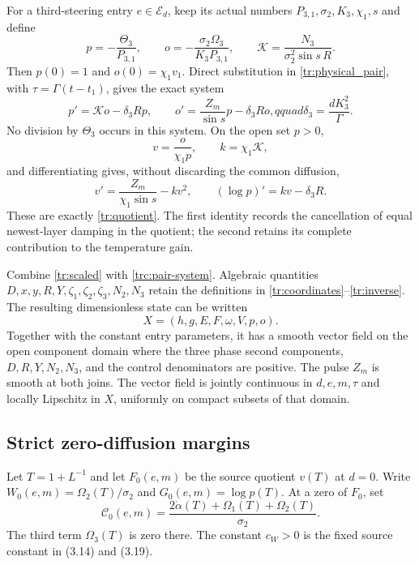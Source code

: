 For a third-steering entry $e\in\mathcal E_d$, keep its actual numbers
$P_{3,1},\sigma_2,K_3,\chi_1,s$ and define
\begin{equation}\label{trc:pair-coordinates}
 p=-\frac{\Theta_3}{P_{3,1}},\qquad
 o=-\frac{\sigma_2\Omega_3}{K_3P_{3,1}},\qquad
 \mathcal K=\frac{N_3}{\sigma_2^2\sin s\,R}.
\end{equation}
Then $p(0)=1$ and $o(0)=\chi_1v_1$.  Direct substitution in
\eqref{tr:physical_pair}, with $\tau=\Gamma(t-t_1)$, gives the exact system
\begin{equation}\label{trc:pair-system}
 p'=\mathcal K o-\delta_3Rp,\qquad
 o'=\frac{Z_m}{\sin s}p-\delta_3Ro,qquad
 \delta_3=\frac{dK_3^2}{\Gamma}.
\end{equation}
No division by $\Theta_3$ occurs in this system.  On the open set $p>0$,
\begin{equation}\label{trc:quotient-map}
 v=\frac{o}{\chi_1p},\qquad k=\chi_1\mathcal K,
\end{equation}
and differentiating gives, without discarding the common diffusion,
\begin{equation}\label{trc:quotient-check}
 v'=\frac{Z_m}{\chi_1\sin s}-kv^2,\qquad
 (\log p)'=kv-\delta_3R.
\end{equation}
These are exactly \eqref{tr:quotient}.  The first identity records the
cancellation of equal newest-layer damping in the quotient; the second
retains its complete contribution to the temperature gain.

Combine \eqref{tr:scaled} with \eqref{trc:pair-system}.  Algebraic
quantities $D,x,y,R,Y,\zeta_1,\zeta_2,\zeta_3,N_2,N_3$ retain the definitions
in \eqref{tr:coordinates}--\eqref{tr:inverse}.  The resulting dimensionless
state can be written
\[
 X=(h,g,E,F,\omega,V,p,o).
\]
Together with the constant entry parameters, it has a smooth vector field
on the open component domain where the three phase second components,
$D,R,Y,N_2,N_3$, and the control denominators are positive.  The pulse
$Z_m$ is smooth at both joins.  The vector field is jointly continuous in
$d,e,m,\tau$ and locally Lipschitz in $X$, uniformly on compact subsets of
that domain.

\subsection{Strict zero-diffusion margins}

Let $T=1+L^{-1}$ and let $F_0(e,m)$ be the source quotient $v(T)$ at
$d=0$.  Write $W_0(e,m)=\Omega_2(T)/\sigma_2$ and
$G_0(e,m)=\log p(T)$.  At a zero of $F_0$, set
\[
 \mathcal C_0(e,m)=
 \frac{2\dot\alpha(T)+\Omega_1(T)+\Omega_2(T)}{\sigma_2}.
\]
The third term $\Omega_3(T)$ is zero there.  The constant $c_W>0$ is the
fixed source constant in (3.14) and (3.19).

